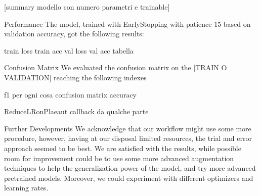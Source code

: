 \documentclass[conference,compsoc,11pt]{IEEEtran}
\begin{document}
[summary modello con numero parametri e trainable]


Performance
The model, trained with EarlyStopping with patience 15 based on validation accuracy, got the following results:

train loss train acc val loss val acc
tabella


Confusion Matrix
We evaluated the confusion matrix on the [TRAIN O VALIDATION] reaching the following indexes

f1 per ogni cosa
confusion matrix
accuracy


ReduceLRonPlaeaut callback da qualche parte



Further Developments
We acknowledge that our workflow might use some more procedure, however, having at our disposal limited resources, the trial and error approach seemed to be best. We are satisfied with the results, while possible room for improvement could be to use some more advanced augmentation techniques to help the generalization power of the model, and try more advanced pretrained models. Moreover, we could experiment with different optimizers and learning rates.

\end{document}
